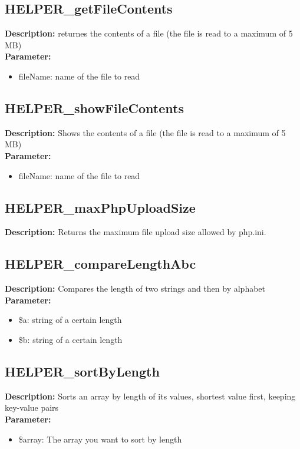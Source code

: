 \subsection{HELPER\_getFileContents}
\textbf{Description:} returnes the contents of a file (the file is read to a maximum of 5 MB)\\
\textbf{Parameter:}
\begin{itemize}
\item fileName: name of the file to read
\end{itemize}

\subsection{HELPER\_showFileContents}
\textbf{Description:} Shows the contents of a file (the file is read to a maximum of 5 MB)\\
\textbf{Parameter:}
\begin{itemize}
\item fileName: name of the file to read
\end{itemize}

\subsection{HELPER\_maxPhpUploadSize}
\textbf{Description:} Returns the maximum file upload size allowed by php.ini.\\

\subsection{HELPER\_compareLengthAbc}
\textbf{Description:} Compares the length of two strings and then by alphabet\\
\textbf{Parameter:}
\begin{itemize}
\item \$a: string of a certain length
\item \$b: string of a certain length
\end{itemize}

\subsection{HELPER\_sortByLength}
\textbf{Description:} Sorts an array by length of its values, shortest value first, keeping key-value pairs\\
\textbf{Parameter:}
\begin{itemize}
\item \$array: The array you want to sort by length
\end{itemize}

